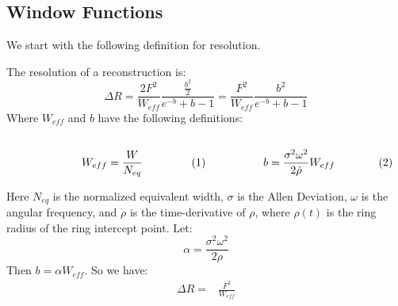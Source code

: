 \documentclass[crop=false,class=book,oneside]{standalone}
\begin{document}
        \subsection{Window Functions}
            We start with the following definition for resolution.
            \begin{definition}
            The resolution of a reconstruction is:
            \begin{equation}
                \Delta{R}=\frac{2F^{2}}{W_{eff}}
                    \frac{\frac{b^2}{2}}{e^{-b}+b-1}
                =\frac{F^{2}}{W_{eff}}\frac{b^2}{e^{-b}+b-1}
            \end{equation}
            Where $W_{eff}$ and $b$ have the following definitions:
            \par
            \begin{subequations}
                \begin{minipage}[b]{0.49\textwidth}
                    \centering
                    \begin{equation}
                        W_{eff}=\frac{W}{N_{eq}}
                    \end{equation}
                \end{minipage}
                \hfill
                \begin{minipage}[b]{0.49\textwidth}
                    \centering
                    \begin{equation}
                        b=\frac{\sigma^2\omega^2}{2\dot{\rho}}W_{eff}
                    \end{equation}
                \end{minipage}
            \end{subequations}
            \par\hfill\par
            Here $N_{eq}$ is the normalized equivalent width,
            $\sigma$ is the Allen Deviation, $\omega$ is the angular
            frequency, and $\dot{\rho}$ is the time-derivative of
            $\rho$, where $\rho(t)$ is the ring radius of the ring
            intercept point. Let:
            \begin{equation}
                \alpha=\frac{\sigma^{2}\omega^{2}}{2\dot{\rho}}
            \end{equation}
            Then $b=\alpha W_{eff}$. So we have:
            \begin{subequations}
                \begin{align}
                    \Delta{R}=&\frac{F^2}{W_{eff}}

\end{align}
\end{subequations}
\end{definition}
\end{document}
